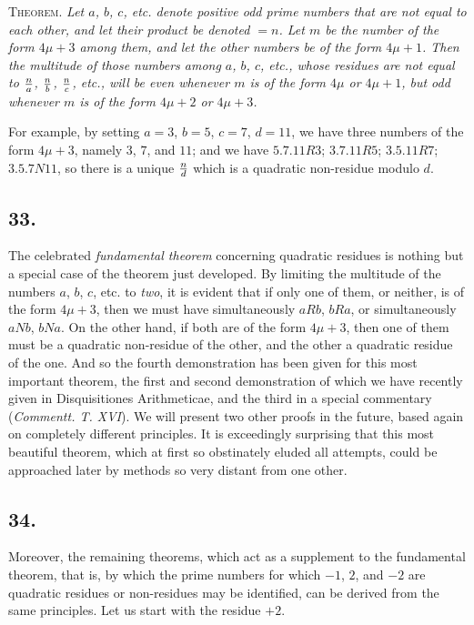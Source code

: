 \documentclass[twoside,12pt]{memoir}
\let\oldfrac\frac
\def\frac#1#2{\mathchoice{\tfrac{#1}{#2}}{\oldfrac{#1}{#2}}{\genfrac{}{}{}{2}{#1}{#2\mathstrut}}{\genfrac{}{}{}{3}{#1}{#2\mathstrut}}}
\begin{document}
\textsc{Theorem.} \textit{Let \(a\), \(b\), \(c\), etc{.} denote positive odd prime numbers that are not equal to each other, and let their product be denoted \(=n\). Let \(m\) be the number of the form \(4\mu + 3\) among them, and let the other numbers be of the form \(4\mu + 1\). Then the multitude of those numbers among \(a\), \(b\), \(c\), etc{.}, whose residues are not equal to \(\frac{n}{a}\), \(\frac{n}{b}\), \(\frac{n}{c}\), etc{.}, will be even whenever \(m\) is of the form \(4\mu\) or \(4\mu + 1\), but odd whenever \(m\) is of the form \(4\mu + 2\) or \(4\mu + 3\).}
 
For example, by setting \(a=3\), \(b=5\), \(c=7\), \(d=11\), we have three numbers of the form \(4\mu + 3\), namely \(3
\), \(7\), and \(11\); and we have \(5 . 7 . 11 R 3\); \(3 . 7 . 11 R 5\); \(3 . 5 . 11 R 7\); \(3 . 5 . 7 N 11\), so there is a unique \(\frac{n}{d}\) which is a quadratic non-residue modulo \(d\).
%

\subsection*{33.}

The celebrated \textit{fundamental theorem} concerning quadratic residues is nothing but a special case of the theorem just developed. By limiting the multitude of the numbers \(a\), \(b\), \(c\), etc{.} to \textit{two}, it is evident that if only one of them, or neither, is of the form \(4 \mu+3\), then we must have simultaneously \(a R b\), \(b R a\), or simultaneously \(a N b\), \(b N a\).  On the other hand, if both are of the form \(4 \mu+3\), then one of them must be a quadratic non-residue of the other, and the other a quadratic residue of the one. And so the fourth demonstration has been given for this most important theorem, the first and second demonstration of which we have recently given in Disquisitiones Arithmeticae, and the third in a special commentary (\textit{Commentt. T. XVI}). We will present two other proofs in the future, based again on completely different principles.  It is exceedingly surprising that this most beautiful theorem, which at first so obstinately eluded all attempts, could be approached later by methods so very distant from one other.
%

\subsection*{34.}

Moreover, the remaining theorems, which act as a supplement to the fundamental theorem, that is, by which the prime numbers for which \(-1\), \(2\), and \(-2\) are quadratic residues or non-residues may be identified, can be derived from the same principles.  Let us start with the residue \(+2\).
%
\end{document}
